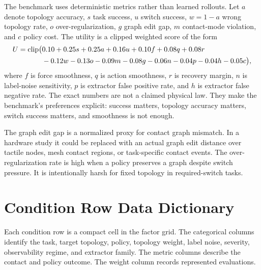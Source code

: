 \documentclass{article}
\begin{document}
The benchmark uses deterministic metrics rather than learned rollouts. Let $a$ denote topology accuracy, $s$ task success, $u$ switch success, $w=1-a$ wrong topology rate, $o$ over-regularization, $g$ graph edit gap, $m$ contact-mode violation, and $c$ policy cost. The utility is a clipped weighted score of the form
\[
\begin{aligned}
U = {\rm clip}\big(&0.10 + 0.25s + 0.25a + 0.16u
+ 0.10f + 0.08q + 0.08r \\
&{}- 0.12w - 0.13o - 0.09m - 0.08g
- 0.06n - 0.04p - 0.04h - 0.05c\big),
\end{aligned}
\]
where $f$ is force smoothness, $q$ is action smoothness, $r$ is recovery margin, $n$ is label-noise sensitivity, $p$ is extractor false positive rate, and $h$ is extractor false negative rate. The exact numbers are not a claimed physical law. They make the benchmark's preferences explicit: success matters, topology accuracy matters, switch success matters, and smoothness is not enough.

The graph edit gap is a normalized proxy for contact graph mismatch. In a hardware study it could be replaced with an actual graph edit distance over tactile nodes, mesh contact regions, or task-specific contact events. The over-regularization rate is high when a policy preserves a graph despite switch pressure. It is intentionally harsh for fixed topology in required-switch tasks.

\section{Condition Row Data Dictionary}

Each condition row is a compact cell in the factor grid. The categorical columns identify the task, target topology, policy, topology weight, label noise, severity, observability regime, and extractor family. The metric columns describe the contact and policy outcome. The weight column records represented evaluations.
\end{document}
